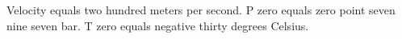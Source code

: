 Velocity equals two hundred meters per second. P zero equals zero point seven nine seven bar. T zero equals negative thirty degrees Celsius.